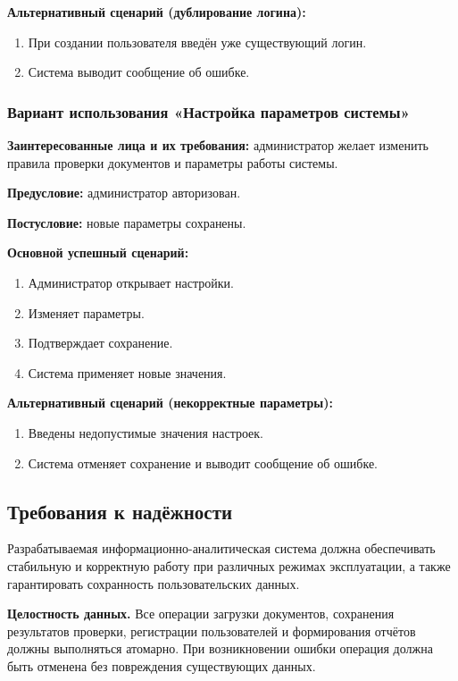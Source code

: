 \textbf{Альтернативный сценарий (дублирование логина):}

\begin{enumerate}
	\item При создании пользователя введён уже существующий логин.
	\item Система выводит сообщение об ошибке.
\end{enumerate}

\subsubsection{Вариант использования «Настройка параметров системы»}

\textbf{Заинтересованные лица и их требования:} администратор желает изменить правила проверки документов и параметры работы системы.

\textbf{Предусловие:} администратор авторизован.

\textbf{Постусловие:} новые параметры сохранены.

\textbf{Основной успешный сценарий:}

\begin{enumerate}
	\item Администратор открывает настройки.
	\item Изменяет параметры.
	\item Подтверждает сохранение.
	\item Система применяет новые значения.
\end{enumerate}

\textbf{Альтернативный сценарий (некорректные параметры):}

\begin{enumerate}
	\item Введены недопустимые значения настроек.
	\item Система отменяет сохранение и выводит сообщение об ошибке.
\end{enumerate}

\subsection{Требования к надёжности}

Разрабатываемая информационно-аналитическая система должна обеспечивать стабильную и корректную работу при различных режимах эксплуатации, а также гарантировать сохранность пользовательских данных.

\textbf{Целостность данных.}
Все операции загрузки документов, сохранения результатов проверки, регистрации пользователей и формирования отчётов должны выполняться атомарно. При возникновении ошибки операция должна быть отменена без повреждения существующих данных.

